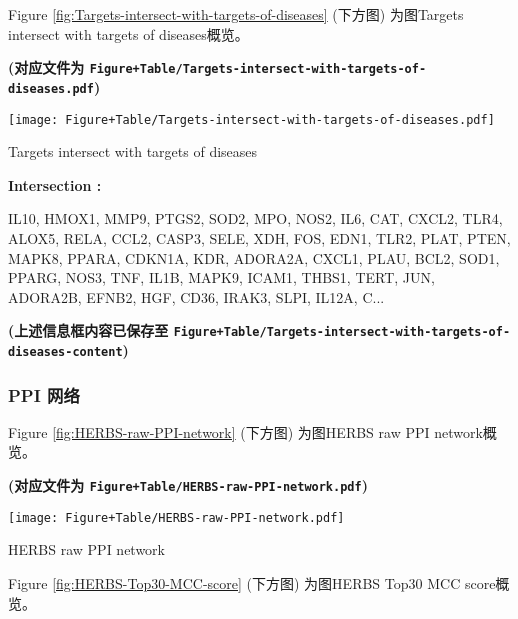 \documentclass[
]{article}
\begin{document}
Figure \ref{fig:Targets-intersect-with-targets-of-diseases} (下方图) 为图Targets intersect with targets of diseases概览。

\textbf{(对应文件为 \texttt{Figure+Table/Targets-intersect-with-targets-of-diseases.pdf})}

\def\@captype{figure}
\begin{center}
\texttt{[image: Figure+Table/Targets-intersect-with-targets-of-diseases.pdf]}
\caption{Targets intersect with targets of diseases}\label{fig:Targets-intersect-with-targets-of-diseases}
\end{center}
\begin{center}\begin{tcolorbox}[colback=gray!10, colframe=gray!50, width=0.9\linewidth, arc=1mm, boxrule=0.5pt]
\textbf{
Intersection
:}

\vspace{0.5em}

    IL10, HMOX1, MMP9, PTGS2, SOD2, MPO, NOS2, IL6, CAT,
CXCL2, TLR4, ALOX5, RELA, CCL2, CASP3, SELE, XDH, FOS,
EDN1, TLR2, PLAT, PTEN, MAPK8, PPARA, CDKN1A, KDR, ADORA2A,
CXCL1, PLAU, BCL2, SOD1, PPARG, NOS3, TNF, IL1B, MAPK9,
ICAM1, THBS1, TERT, JUN, ADORA2B, EFNB2, HGF, CD36, IRAK3,
SLPI, IL12A, C...

\vspace{2em}
\end{tcolorbox}
\end{center}

\textbf{(上述信息框内容已保存至 \texttt{Figure+Table/Targets-intersect-with-targets-of-diseases-content})}

\hypertarget{ppi-ux7f51ux7edc}{%
\subsubsection{PPI 网络}\label{ppi-ux7f51ux7edc}}

Figure \ref{fig:HERBS-raw-PPI-network} (下方图) 为图HERBS raw PPI network概览。

\textbf{(对应文件为 \texttt{Figure+Table/HERBS-raw-PPI-network.pdf})}

\def\@captype{figure}
\begin{center}
\texttt{[image: Figure+Table/HERBS-raw-PPI-network.pdf]}
\caption{HERBS raw PPI network}\label{fig:HERBS-raw-PPI-network}
\end{center}

Figure \ref{fig:HERBS-Top30-MCC-score} (下方图) 为图HERBS Top30 MCC score概览。
\end{document}
